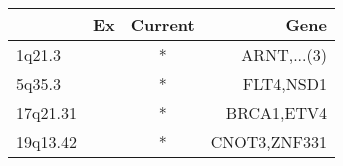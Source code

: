 \begin{tabular}{lccr}
\toprule
{} & Ex & Current &          Gene \\
\midrule
1q21.3   &    &       * &   ARNT,...(3) \\
5q35.3   &    &       * &     FLT4,NSD1 \\
17q21.31 &    &       * &    BRCA1,ETV4 \\
19q13.42 &    &       * &  CNOT3,ZNF331 \\
\bottomrule
\end{tabular}
